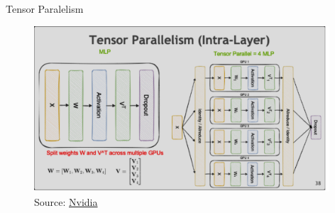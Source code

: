 
\begin{vbframe}{Tensor Paralelism}

\vfill

\begin{figure}
	\centering
	\includegraphics[width = 11cm]{./figure/tensor_paralel.png} \\ 
	{\footnotesize Source: \href{https://docs.nvidia.com/deeplearning/nemo/user-guide/docs/en/stable/nlp/nemo_megatron/parallelisms.html}{Nvidia}}
\end{figure}

\vfill

\end{vbframe}


%
%
%  
%
%


